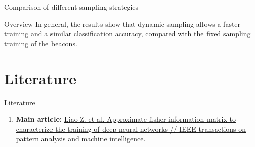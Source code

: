 \documentclass{beamer}
\begin{document}
\begin{frame}{Comparison of different sampling strategies}
\begin{table}
\begin{center}
\end{center}
\caption{The comparison between the best "beacon" model {\bf s\#} (at {\bf lr0.1}), and the best dynamic sampling models {\bf -$\emptyset$}, and {\bf -MS}. The latter ({\bf -MS}) corresponds to sampling of mini-batch sizes over each different learning rate value.}
\label{table:dynamic_sampling}
\end{table}
\vspace{-0.5cm}
\begin{block}{Overview}
    In general, the results show that dynamic sampling allows a faster training and a similar classification accuracy, compared with the fixed sampling training of the beacons. 
\end{block}
\end{frame}

\section{Literature}
\begin{frame}{Literature}
    \begin{enumerate}
        \item \textbf{Main article:} \href{https://arxiv.org/abs/1810.06767}
        {Liao Z. et al. Approximate fisher information matrix to characterize the training of deep neural networks // IEEE transactions on pattern analysis and machine intelligence.}
    \end{enumerate}
\end{frame}
\end{document}
